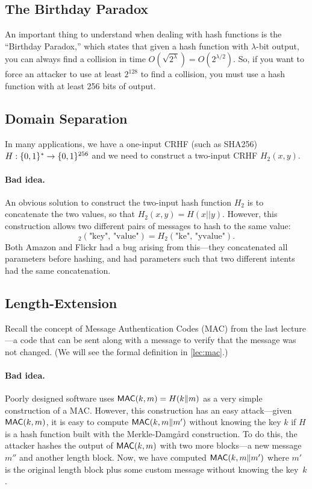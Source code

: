 \subsection{The Birthday Paradox}
An important thing to understand when dealing with hash functions is the ``Birthday Paradox,'' 
which states that given a hash function with $\lambda$-bit output, you can 
always find a collision in time $O(\sqrt{2^\lambda}) = O(2^{\lambda/2})$.
So, if you want to force an attacker to use at least $2^{128}$ to find a collision,
you must use a hash function with at least 256 bits of output.

\subsection{Domain Separation}
In many applications, we have a one-input CRHF (such as SHA256) $H: \{0,1\}^* \rightarrow \{0,1\}^{256}$ 
and we need to construct a two-input CRHF $H_2(x, y)$. 

\paragraph{Bad idea.} An obvious solution to construct the two-input hash function $H_2$ 
is to concatenate the two values, so that $H_2(x, y) = H(x || y)$.
However, this construction allows two different pairs of messages to hash to the same value:
\[ _2(\text{"key", "value"}) = H_2(\text{"ke", "yvalue"}).\]
Both Amazon and Flickr had a bug arising from
this---they concatenated all parameters before
hashing, and had parameters such that two
different intents had the same concatenation.\autocite{flickr}

\subsection{Length-Extension}
Recall the concept of Message Authentication Codes
(MAC) from the last lecture---a code that can be
sent along with a message to verify that the message was not changed.
(We will see the formal definition in \cref{lec:mac}.)

\paragraph{Bad idea.}
Poorly designed software uses $\mathsf{MAC}(k, m) = H(k \| m)$ as a very simple construction of a MAC.
However, this construction has an easy attack---given $\mathsf{MAC}(k, m)$, it is easy to compute $\mathsf{MAC}(k, m\|m')$ 
without knowing the key $k$ if $H$ is a hash function built with the Merkle-Damg\aa{}rd construction.
To do this, the attacker hashes the output of $\mathsf{MAC}(k, m)$ with two more blocks---a new 
message $m''$ and another length block. Now, we
have computed $\mathsf{MAC}(k, m\|m')$ where $m'$ is the
original length block plus some custom message
without knowing the key~$k$. 

